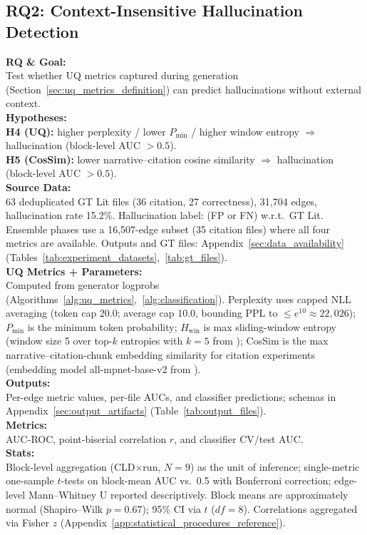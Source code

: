 \subsection{RQ2: Context-Insensitive Hallucination Detection}
\label{sec:rq2_experiments}

\noindent\textbf{RQ \& Goal:}\\
Test whether UQ metrics captured during generation (Section~\ref{sec:uq_metrics_definition}) can predict hallucinations without external context.\\
\textbf{Hypotheses:}\\
\textbf{H4 (UQ):} higher perplexity / lower $P_{\min}$ / higher window entropy $\Rightarrow$ hallucination (block-level AUC $>0.5$).\\
\textbf{H5 (CosSim):} lower narrative--citation cosine similarity $\Rightarrow$ hallucination (block-level AUC $>0.5$).\\
\textbf{Source Data:}\\
63 deduplicated GT Lit files (36 citation, 27 correctness), 31{,}704 edges, hallucination rate 15.2\%. Hallucination label: (FP or FN) w.r.t.\ GT Lit. Ensemble phases use a 16{,}507-edge subset (35 citation files) where all four metrics are available. Outputs and GT files: Appendix~\ref{sec:data_availability} (Tables~\ref{tab:experiment_datasets},~\ref{tab:gt_files}).\\
\textbf{UQ Metrics + Parameters:}\\
Computed from generator logprobs (Algorithms~\ref{alg:uq_metrics},~\ref{alg:classification}). Perplexity uses capped NLL averaging (token cap 20.0; average cap 10.0, bounding PPL to $\le e^{10}\approx22{,}026$); $P_{\min}$ is the minimum token probability; $H_{\text{win}}$ is max sliding-window entropy (window size 5 over top-$k$ entropies with $k{=}5$ from \cite{openai2024api}); CosSim is the max narrative--citation-chunk embedding similarity for citation experiments (embedding model all-mpnet-base-v2 from \cite{muennighoff2023mteb}).\\
\textbf{Outputs:}\\
Per-edge metric values, per-file AUCs, and classifier predictions; schemas in Appendix~\ref{sec:output_artifacts} (Table~\ref{tab:output_files}).\\
\textbf{Metrics:}\\
AUC-ROC, point-biserial correlation $r$, and classifier CV/test AUC.\\
\textbf{Stats:}\\
Block-level aggregation (CLD$\times$run, $N{=}9$) as the unit of inference; single-metric one-sample $t$-tests on block-mean AUC vs.\ 0.5 with Bonferroni correction; edge-level Mann--Whitney U reported descriptively. Block means are approximately normal (Shapiro--Wilk $p{=}0.67$); 95\% CI via $t$ ($df{=}8$). Correlations aggregated via Fisher $z$ (Appendix~\ref{app:statistical_procedures_reference}).

